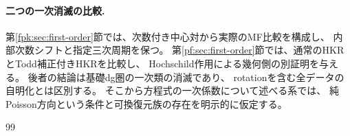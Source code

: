 \paragraph{二つの一次消滅の比較.}
第\ref{fpk:sec:first-order}節では、次数付き中心対から実際のMF比較を構成し、
内部次数シフトと指定三次周期を保つ。
第\ref{pf:sec:first-order}節では、通常のHKRとTodd補正付きHKRを比較し、
Hochschild作用による幾何側の別証明を与える\cite[Theorem~1.4]{PFCRVdB}。
後者の結論は基礎dg圏の一次類の消滅であり、
rotationを含む全データの自明化とは区別する。
そこから方程式の一次係数について述べる系では、
純Poisson方向という条件と可換復元族の存在を明示的に仮定する。



\appendix

\begin{thebibliography}{99}

\end{thebibliography}

